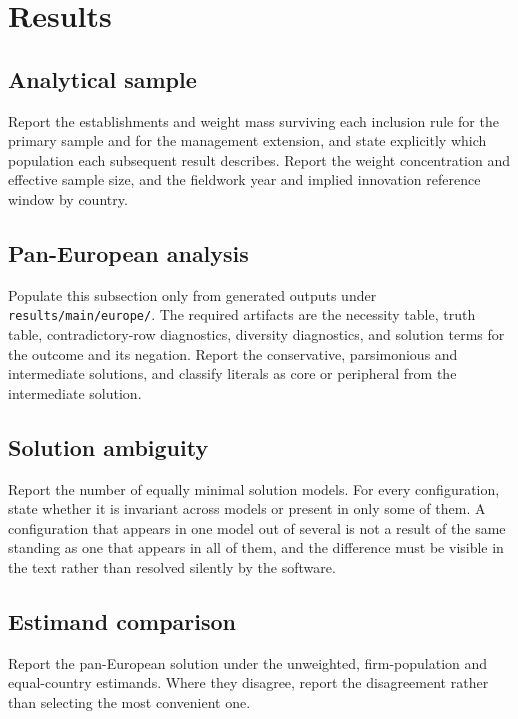 \section{Results}

\subsection{Analytical sample}

Report the establishments and weight mass surviving each inclusion rule for the
primary sample and for the management extension, and state explicitly which
population each subsequent result describes. Report the weight concentration and
effective sample size, and the fieldwork year and implied innovation reference
window by country.

\subsection{Pan-European analysis}

Populate this subsection only from generated outputs under
\texttt{results/main/europe/}. The required artifacts are the necessity table,
truth table, contradictory-row diagnostics, diversity diagnostics, and solution
terms for the outcome and its negation. Report the conservative, parsimonious
and intermediate solutions, and classify literals as core or peripheral from the
intermediate solution.

\subsection{Solution ambiguity}

Report the number of equally minimal solution models. For every configuration,
state whether it is invariant across models or present in only some of them. A
configuration that appears in one model out of several is not a result of the
same standing as one that appears in all of them, and the difference must be
visible in the text rather than resolved silently by the software.

\subsection{Estimand comparison}

Report the pan-European solution under the unweighted, firm-population and
equal-country estimands. Where they disagree, report the disagreement rather
than selecting the most convenient one.

